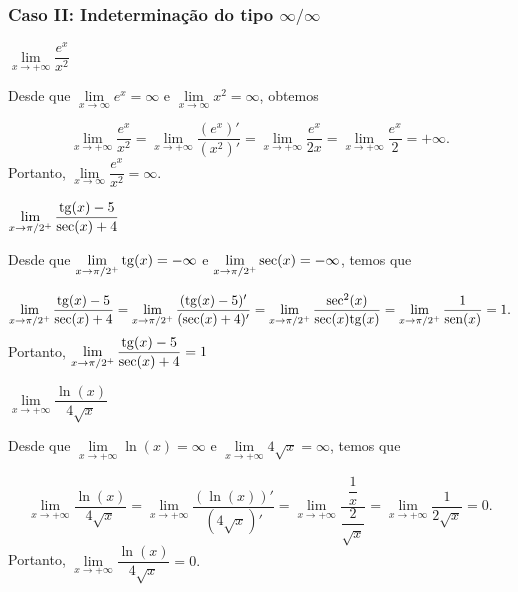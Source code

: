 \cleardoublepage\documentclass[../main.tex]{subfiles}
\begin{document}
\subsubsection*{\textbf{Caso II: Indeterminação do tipo} $\mathbf{\infty/\infty}$}
\begin{exeresol}
  \begin{compactenum}[a)]
  \item \(\lim \limits_{x\to +\infty}\dfrac{e^x}{x^2}\)
  
  \begin{resol}
  Desde que \(\lim \limits_{x\to \infty}e^x=\infty\) e \(\lim \limits_{x\to \infty}{x^2}=\infty\), obtemos

\[ \lim \limits_{x\to +\infty}\dfrac{e^x}{x^2}=\lim \limits_{x\to +\infty}\dfrac{(e^x)'}{(x^2)'}=\lim \limits_{x\to +\infty}\dfrac{e^x}{2x}=\lim \limits_{x\to +\infty}\dfrac{e^x}{2}=+\infty. \]
Portanto, \(\lim \limits_{x\to \infty}\dfrac{e^x}{x^2}=\infty\).
  \end{resol}
  \item \(\lim \limits_{x\to \pi/2^+}\dfrac{{\rm tg}(x)-5}{{\rm sec}(x)+4}\)
  
  \begin{resol}
  Desde que \(\lim \limits_{x\to \pi/2^+}{\rm tg}(x)=-\infty\) e \(\lim \limits_{x\to \pi/2^+}{\rm sec}(x)=-\infty\), temos que

\[ \lim \limits_{x\to \pi/2^+}\dfrac{{\rm tg}(x)-5}{{\rm sec}(x)+4}=\lim \limits_{x\to \pi/2^+}\dfrac{({\rm tg}(x)-5)'}{({\rm sec}(x)+4)'}=\lim \limits_{x\to \pi/2^+}\dfrac{{\rm sec}^2(x)}{{\rm sec}(x){\rm tg}(x)}=\lim \limits_{x\to \pi/2^+}\dfrac{1}{{\rm sen}(x)}=1. \]
Portanto, \(\lim \limits_{x\to \pi/2^+}\dfrac{{\rm tg}(x)-5}{{\rm sec}(x)+4}=1\)
  \end{resol}
  \item \(\lim \limits_{x\to +\infty}\dfrac{\ln(x)}{4\sqrt{x}}\)
  
  \begin{resol}
  Desde que \(\lim \limits_{x\to+\infty}\ln(x)=\infty\) e \(\lim \limits_{x\to +\infty}4\sqrt{x}=\infty\), temos que

\[ \lim \limits_{x\to +\infty}\dfrac{\ln(x)}{4\sqrt{x}}=\lim \limits_{x\to +\infty}\dfrac{(\ln(x))'}{(4\sqrt{x})'}= \lim \limits_{x\to +\infty}\dfrac{\dfrac{1}{x}}{\dfrac{2}{\sqrt{x}}}=\lim \limits_{x \to +\infty}\dfrac{1}{2\sqrt{x}}=0. \]
Portanto, \(\lim \limits_{x\to +\infty}\dfrac{\ln(x)}{4\sqrt{x}}=0.\)
  \end{resol}
  \end{compactenum}
\end{exeresol}
\vspace{-0.2cm}
\end{document}
